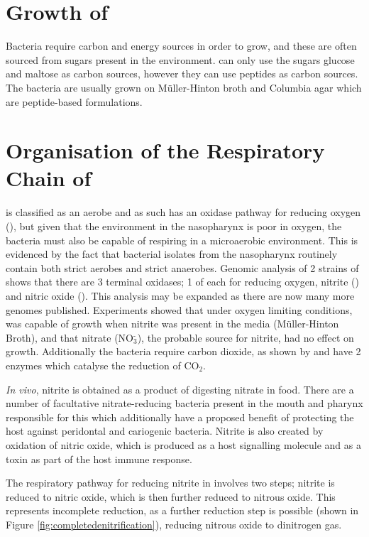 \section{Growth of \Nm{}}
Bacteria require carbon and energy sources in order to grow, and these are often sourced from sugars present in the environment. \Nm{} can only use the sugars glucose and maltose as carbon sources\cite{Exley2005,Beno1968}, however they can use peptides as carbon sources. The bacteria are usually grown on M\"uller-Hinton broth and Columbia agar which are peptide-based formulations. 

\section{Organisation of the Respiratory Chain of \Nm{}}
\Nm{} is classified as an aerobe and as such has an oxidase pathway for reducing oxygen (\cOxygen{}), but given that the environment in the nasopharynx is poor in oxygen, the bacteria must also be capable of respiring in a microaerobic environment. This is evidenced by the fact that bacterial isolates from the nasopharynx routinely contain both strict aerobes and strict anaerobes\cite{Rock2005}. Genomic analysis of 2 strains of \Nm{} shows that there are 3 terminal oxidases; 1 of each for reducing oxygen, nitrite (\cNitrite{}) and nitric oxide (\cNO{})\cite{Rock2005a}. This analysis may be expanded as there are now many more genomes published. Experiments showed that under oxygen limiting conditions, \Nm{} was capable of growth when nitrite was present in the media (M\"uller-Hinton Broth), and that nitrate (NO$_{\textrm{3}}^{\textrm{-}}$), the probable source for nitrite, had no effect on growth\cite{Rock2005a}. Additionally the bacteria require carbon dioxide, as shown by \citet{Tuttle1952} and have 2 enzymes which catalyse the reduction of CO$_{\textrm{2}}$\cite{DeVoe1982}.

\textit{In vivo}, nitrite is obtained as a product of digesting nitrate in food. There are a number of facultative nitrate-reducing bacteria present in the mouth and pharynx responsible for this\cite{Rock2005} which additionally have a proposed benefit of protecting the host against peridontal and cariogenic bacteria\cite{Lundberg2004}. Nitrite is also created by oxidation of nitric oxide, which is produced as a host signalling molecule and as a toxin as part of the host immune response\cite{Lundberg2004,Rock2005}.

The respiratory pathway for reducing nitrite in \Nm{} involves two steps; nitrite is reduced to nitric oxide, which is then further reduced to nitrous oxide. This represents incomplete reduction, as a further reduction step is possible (shown in Figure \ref{fig:completedenitrification}), reducing nitrous oxide to dinitrogen gas\cite{Rock2005,Deeudom2006}.

